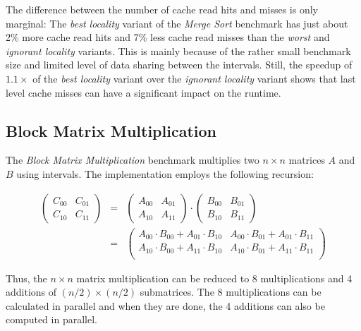 The difference between the number of cache read hits and misses is
only marginal: The \emph{best locality} variant of the \emph{Merge
  Sort} benchmark has just about 2\% more cache read hits and 7\% less
cache read misses than the \emph{worst} and \emph{ignorant locality}
variants. This is mainly because of the rather small benchmark size
and limited level of data sharing between the intervals. Still, the
speedup of $1.1\times$ of the \emph{best locality} variant over the
\emph{ignorant locality} variant shows that last level cache misses
can have a significant impact on the runtime.


\subsection{Block Matrix Multiplication}
\label{sec:locality-performance-matmult}

The \emph{Block Matrix Multiplication} benchmark multiplies two $n
\times n$ matrices $A$ and $B$ using intervals. The implementation
employs the following recursion:

\begin{eqnarray*}
  \begin{pmatrix}
    C_{00} & C_{01} \\
    C_{10} & C_{11}
  \end{pmatrix}
  &
  =
  &
  \begin{pmatrix}
    A_{00} & A_{01} \\
    A_{10} & A_{11}
  \end{pmatrix}
  \cdot
  \begin{pmatrix}
    B_{00} & B_{01} \\
    B_{10} & B_{11}
  \end{pmatrix}
  \\[0.1cm]
  &
  =
  &
  \begin{pmatrix}
    A_{00} \cdot B_{00} + A_{01} \cdot B_{10} & A_{00} \cdot B_{01} + A_{01} \cdot B_{11} \\
    A_{10} \cdot B_{00} + A_{11} \cdot B_{10} & A_{10} \cdot B_{01} + A_{11} \cdot B_{11} \\
  \end{pmatrix}
\end{eqnarray*}

\vspace{0.1cm}

Thus, the $n \times n$ matrix multiplication can be reduced to 8
multiplications and 4 additions of $(n/2) \times (n/2)$
submatrices. The 8 multiplications can be calculated in parallel and
when they are done, the 4 additions can also be computed in parallel.

